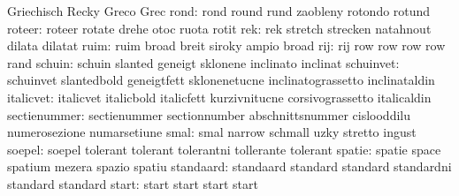                            Griechisch                Recky
                           Greco                     Grec
                     rond: rond                      round
                           rund                      zaobleny
                           rotondo                   rotund
                   roteer: roteer                    rotate
                           drehe                     otoc
                           ruota                     rotit
                      rek: rek                       stretch
                           strecken                  natahnout
                           dilata                    dilatat
                     ruim: ruim                      broad
                           breit                     siroky
                           ampio                     broad
                      rij: rij                       row
                           row                       row
                           row                       rand
                   schuin: schuin                    slanted
                           geneigt                   sklonene
                           inclinato                 inclinat
                schuinvet: schuinvet                 slantedbold
                           geneigtfett               sklonenetucne
                           inclinatograssetto        inclinataldin
                italicvet: italicvet                 italicbold
                           italicfett                kurzivnitucne
                           corsivograssetto          italicaldin
             sectienummer: sectienummer              sectionnumber
                           abschnittsnummer          cislooddilu
                           numerosezione             numarsetiune
                     smal: smal                      narrow
                           schmall                   uzky
                           stretto                   ingust
                   soepel: soepel                    tolerant
                           tolerant                  tolerantni
                           tollerante                tolerant
                   spatie: spatie                    space
                           spatium                   mezera
                           spazio                    spatiu %
                standaard: standaard                 standard
                           standard                  standardni
                           standard                  standard
                    start: start                     start
                           start                     start
